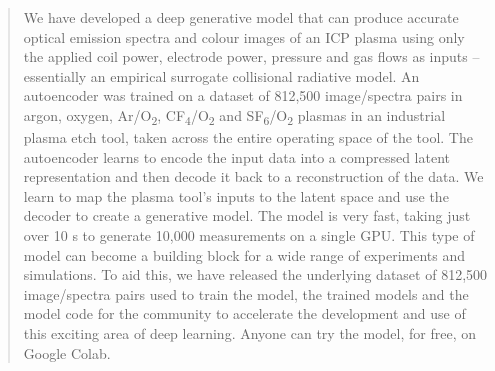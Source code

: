 \documentclass[10pt]{iopart}
\newcommand{\gtnote}[2][\textcolor{olive}{\dagger}]{$#1$\marginpar{\color{olive}\raggedright\tiny$#1$ #2}}
\begin{document}
\begin{abstract}


We have developed a deep generative model that can produce accurate optical emission spectra and colour images of an ICP plasma using only the applied coil power, electrode power, pressure and gas flows as inputs -- essentially an empirical surrogate collisional radiative model. An autoencoder was trained on a dataset of 812,500 image/spectra pairs in argon, oxygen, Ar/O\textsubscript{2}, CF\textsubscript{4}/O\textsubscript{2} and SF\textsubscript{6}/O\textsubscript{2} plasmas in an industrial plasma etch tool, taken across the entire operating space of the tool. The autoencoder learns to encode the input data into a compressed latent representation and then decode it back to a reconstruction of the data. We learn to map the plasma tool's inputs to the latent space and use the decoder to create a generative model. The model is very fast, taking just over 10 s to generate 10,000 measurements on a single GPU. This type of model can become a building block for a wide range of experiments and simulations. To aid this, we have released the underlying dataset of 812,500 image/spectra pairs used to train the model, the trained models and the model code for the community to accelerate the development and use of this exciting area of deep learning. Anyone can try the model, for free, on Google Colab. %



\end{abstract}
\end{document}
